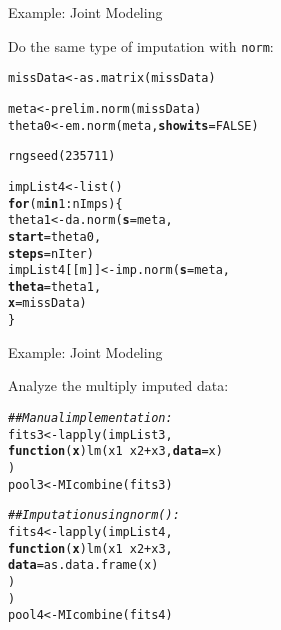 \documentclass{beamer}\usepackage[]{graphicx}\usepackage[]{color}
\makeatletter
\newcommand{\hlnum}[1]{\textcolor[rgb]{0.69,0.494,0}{#1}}%
\newcommand{\hlcom}[1]{\textcolor[rgb]{0.514,0.506,0.514}{\textit{#1}}}%
\newcommand{\hlopt}[1]{\textcolor[rgb]{0,0,0}{#1}}%
\newcommand{\hlstd}[1]{\textcolor[rgb]{0,0,0}{#1}}%
\newcommand{\hlkwa}[1]{\textcolor[rgb]{0,0,0}{\textbf{#1}}}%
\newcommand{\hlkwb}[1]{\textcolor[rgb]{0,0.341,0.682}{#1}}%
\newcommand{\hlkwc}[1]{\textcolor[rgb]{0,0,0}{\textbf{#1}}}%
\newcommand{\hlkwd}[1]{\textcolor[rgb]{0.004,0.004,0.506}{#1}}%
\newenvironment{kframe}{%
 \def\at@end@of@kframe{}%
 \ifinner\ifhmode%
  \def\at@end@of@kframe{\end{minipage}}%
  \begin{minipage}{\columnwidth}%
 \fi\fi%
 \def\FrameCommand##1{\hskip\@totalleftmargin \hskip-\fboxsep
 \colorbox{shadecolor}{##1}\hskip-\fboxsep
     \hskip-\linewidth \hskip-\@totalleftmargin \hskip\columnwidth}%
 \MakeFramed {\advance\hsize-\width
   \@totalleftmargin\z@ \linewidth\hsize
   \@setminipage}}%
 {\par\unskip\endMakeFramed%
 \at@end@of@kframe}
\newenvironment{knitrout}{}{} %
\makeatother
\begin{document}
\begin{frame}[fragile]{Example: Joint Modeling}
  
  Do the same type of imputation with \texttt{norm}:
  
\begin{knitrout}\footnotesize
{}\color{fgcolor}\begin{kframe}
\begin{alltt}
\hlstd{missData} \hlkwb{<-} \hlkwd{as.matrix}\hlstd{(missData)}

\hlstd{meta}   \hlkwb{<-} \hlkwd{prelim.norm}\hlstd{(missData)}
\hlstd{theta0} \hlkwb{<-} \hlkwd{em.norm}\hlstd{(meta,} \hlkwc{showits} \hlstd{=} \hlnum{FALSE}\hlstd{)}

\hlkwd{rngseed}\hlstd{(}\hlnum{235711}\hlstd{)}

\hlstd{impList4} \hlkwb{<-} \hlkwd{list}\hlstd{()}
\hlkwa{for}\hlstd{(m} \hlkwa{in} \hlnum{1} \hlopt{:} \hlstd{nImps) \{}
    \hlstd{theta1} \hlkwb{<-} \hlkwd{da.norm}\hlstd{(}\hlkwc{s}     \hlstd{= meta,}
                      \hlkwc{start} \hlstd{= theta0,}
                      \hlkwc{steps} \hlstd{= nIter)}
    \hlstd{impList4[[m]]} \hlkwb{<-} \hlkwd{imp.norm}\hlstd{(}\hlkwc{s}     \hlstd{= meta,}
                              \hlkwc{theta} \hlstd{= theta1,}
                              \hlkwc{x}     \hlstd{= missData)}
\hlstd{\}}
\end{alltt}
\end{kframe}
\end{knitrout}

\end{frame}


\begin{frame}[fragile]{Example: Joint Modeling}

  Analyze the multiply imputed data:

\begin{knitrout}\footnotesize
{}\color{fgcolor}\begin{kframe}
\begin{alltt}
\hlcom{## Manual implementation:}
\hlstd{fits3} \hlkwb{<-} \hlkwd{lapply}\hlstd{(impList3,}
                \hlkwa{function}\hlstd{(}\hlkwc{x}\hlstd{)} \hlkwd{lm}\hlstd{(x1} \hlopt{~} \hlstd{x2} \hlopt{+} \hlstd{x3,} \hlkwc{data} \hlstd{= x)}
                \hlstd{)}
\hlstd{pool3} \hlkwb{<-} \hlkwd{MIcombine}\hlstd{(fits3)}

\hlcom{## Imputation using norm():}
\hlstd{fits4} \hlkwb{<-} \hlkwd{lapply}\hlstd{(impList4,}
                \hlkwa{function}\hlstd{(}\hlkwc{x}\hlstd{)} \hlkwd{lm}\hlstd{(x1} \hlopt{~} \hlstd{x2} \hlopt{+} \hlstd{x3,}
                               \hlkwc{data} \hlstd{=} \hlkwd{as.data.frame}\hlstd{(x)}
                               \hlstd{)}
                \hlstd{)}
\hlstd{pool4} \hlkwb{<-} \hlkwd{MIcombine}\hlstd{(fits4)}
\end{alltt}
\end{kframe}
\end{knitrout}

\end{frame}
\end{document}
